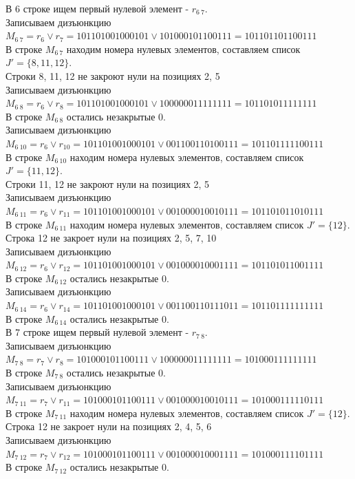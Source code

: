 \documentclass[a4paper,12pt]{article}
\begin{document}
\noindent
В 6 строке ищем первый нулевой элемент - $r_{6\ 7}$.\\
Записываем дизъюнкцию $M_{6\ 7} = r_{6}\lor r_{7} = 101101001000101 \lor 101000101100111 = 101101101100111$\\
В строке $M_{6\ 7}$ находим номера нулевых элементов, составляем список $J' = \{8, 11, 12\}$.\\
Строки 8, 11, 12 не закроют нули на позициях 2, 5\\
Записываем дизъюнкцию $M_{6\ 8} = r_{6}\lor r_{8} = 101101001000101 \lor 100000011111111 = 101101011111111$\\
В строке $M_{6\ 8}$ остались незакрытые 0.\\
Записываем дизъюнкцию $M_{6\ 10} = r_{6}\lor r_{10} = 101101001000101 \lor 001100110100111 = 101101111100111$\\
В строке $M_{6\ 10}$ находим номера нулевых элементов, составляем список $J' = \{11, 12\}$.\\
Строки 11, 12 не закроют нули на позициях 2, 5\\
Записываем дизъюнкцию $M_{6\ 11} = r_{6}\lor r_{11} = 101101001000101 \lor 001000010010111 = 101101011010111$\\
В строке $M_{6\ 11}$ находим номера нулевых элементов, составляем список $J' = \{12\}$.\\
Строка 12 не закроет нули на позициях 2, 5, 7, 10\\
Записываем дизъюнкцию $M_{6\ 12} = r_{6}\lor r_{12} = 101101001000101 \lor 001000010001111 = 101101011001111$\\
В строке $M_{6\ 12}$ остались незакрытые 0.\\
Записываем дизъюнкцию $M_{6\ 14} = r_{6}\lor r_{14} = 101101001000101 \lor 001100110111011 = 101101111111111$\\
В строке $M_{6\ 14}$ остались незакрытые 0.\\

\noindent
В 7 строке ищем первый нулевой элемент - $r_{7\ 8}$.\\
Записываем дизъюнкцию $M_{7\ 8} = r_{7}\lor r_{8} = 101000101100111 \lor 100000011111111 = 101000111111111$\\
В строке $M_{7\ 8}$ остались незакрытые 0.\\
Записываем дизъюнкцию $M_{7\ 11} = r_{7}\lor r_{11} = 101000101100111 \lor 001000010010111 = 101000111110111$\\
В строке $M_{7\ 11}$ находим номера нулевых элементов, составляем список $J' = \{12\}$.\\
Строка 12 не закроет нули на позициях 2, 4, 5, 6\\
Записываем дизъюнкцию $M_{7\ 12} = r_{7}\lor r_{12} = 101000101100111 \lor 001000010001111 = 101000111101111$\\
В строке $M_{7\ 12}$ остались незакрытые 0.\\
\end{document}

